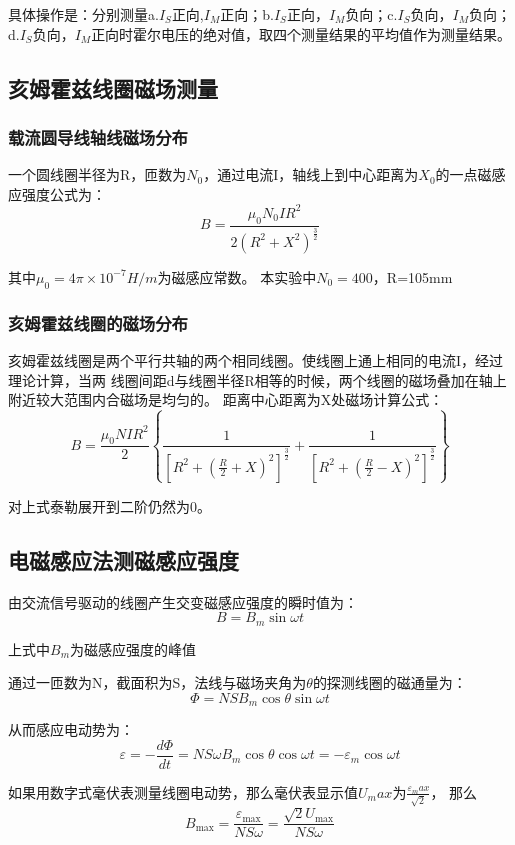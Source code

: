 \documentclass[12pt,a4paper]{article}
\begin{document}
        具体操作是：分别测量a.$I_S$正向,$I_M$正向；b.$I_S$正向，$I_M$负向；c.$I_S$负向，$I_M$负向；
        d.$I_S$负向，$I_M$正向时霍尔电压的绝对值，取四个测量结果的平均值作为测量结果。

    \subsection{亥姆霍兹线圈磁场测量}
        \subsubsection{载流圆导线轴线磁场分布}
        一个圆线圈半径为R，匝数为$N_0$，通过电流I，轴线上到中心距离为$X_0$的一点磁感应强度公式为：
        \[B = \frac{{{\mu _0}{N_0}I{R^2}}}{{2{{({R^2} + {X^2})}^{\frac{3}{2}}}}}\]

        其中${\mu _0}=4\pi\times10^{-7}H/m$为磁感应常数。
        本实验中${N_0}=400$，R=105mm

        \subsubsection{亥姆霍兹线圈的磁场分布}
        亥姆霍兹线圈是两个平行共轴的两个相同线圈。使线圈上通上相同的电流I，经过理论计算，当两
        线圈间距d与线圈半径R相等的时候，两个线圈的磁场叠加在轴上附近较大范围内合磁场是均匀的。
        距离中心距离为X处磁场计算公式：
        \[B = \frac{{{\mu _0}NI{R^2}}}{2}\left\{ {\frac{1}{{{{\left[ {{R^2} + {{\left( {\frac{R}{2} + X} \right)}^2}} \right]}^{\frac{3}{2}}}}} + \frac{1}{{{{\left[ {{R^2} + {{\left( {\frac{R}{2} - X} \right)}^2}} \right]}^{\frac{3}{2}}}}}} \right\}\]

        对上式泰勒展开到二阶仍然为0。

        \subsection{电磁感应法测磁感应强度}
        由交流信号驱动的线圈产生交变磁感应强度的瞬时值为：
        \[B = {B_m}\sin \omega t\]

        上式中$B_m$为磁感应强度的峰值

        通过一匝数为N，截面积为S，法线与磁场夹角为$\theta$的探测线圈的磁通量为：
        \[\Phi  = NS{B_m}\cos \theta \sin \omega t\]

        从而感应电动势为：
        \[\varepsilon  =  - \frac{{d\Phi }}{{dt}} = NS\omega {B_m}\cos \theta \cos \omega t =  - {\varepsilon _m}\cos \omega t\]

        如果用数字式毫伏表测量线圈电动势，那么毫伏表显示值$U_max$为$\frac{\varepsilon_max}{\sqrt{2}}$，
        那么
        \[{B_{\max }} = \frac{{{\varepsilon _{\max }}}}{{NS\omega }} = \frac{{\sqrt 2 {U_{\max }}}}{{NS\omega }}\]
\end{document}
